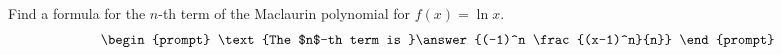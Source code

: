 \documentclass{ximera}
\author{Gregory Hartman \and Matthew Carr}
\begin{document}
\begin{exercise}





Find a formula for the $n$-th term of the Maclaurin polynomial for $f(x)=\ln x$. 
\[
\begin{prompt}
\text{The $n$-th term is }\answer{(-1)^n \frac{(x-1)^n}{n}}
\end{prompt}
\]

\end{exercise}
\end{document}

